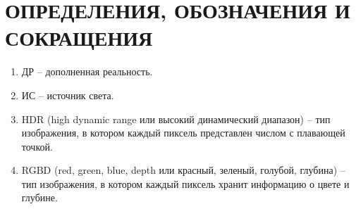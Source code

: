 \chapter*{ОПРЕДЕЛЕНИЯ, ОБОЗНАЧЕНИЯ И СОКРАЩЕНИЯ}

\begin{enumerate}
	\item ДР -- дополненная реальность. 
	\item ИС -- источник света.
	\item HDR (high dynamic range или высокий динамический диапазон) -- тип изображения, в котором каждый пиксель представлен числом с плавающей точкой.
	\item RGBD (red, green, blue, depth  или красный, зеленый, голубой, глубина) -- тип изображения, в котором каждый пиксель хранит информацию о цвете и глубине.
\end{enumerate}